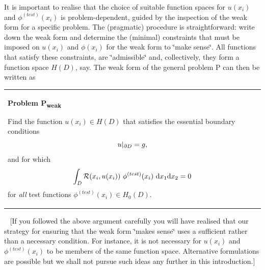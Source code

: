 It is important to realise that the choice of suitable function spaces for $u(x_i)$ and $\phi^{(test)}(x_i)$ is problem-\/dependent, guided by the inspection of the weak form for a specific problem. The (pragmatic) procedure is straightforward\+: write down the weak form and determine the (minimal) constraints that must be imposed on $u(x_i)$ and $\phi(x_i)$ for the weak form to \char`\"{}make sense\char`\"{}. All functions that satisfy these constraints, are \char`\"{}admissible\char`\"{} and, collectively, they form a function space $ H(D) $, say. The weak form of the general problem P can then be written as ~\newline
 ~\newline
\begin{center} \tabulinesep=1mm
\begin{longtabu} spread 0pt [c]{*{1}{|X[-1]}|}
\hline
\begin{center}{\bfseries  Problem P\textsubscript{weak} }\end{center}  \begin{center} Find the function $ u(x_i) \in H(D) $ that satisfies the essential boundary conditions \[ \hfill u|_{\partial D} = g, \] and for which \[ \int_D {\cal R}(x_i,u(x_i)) \ \phi^{(test)}(x_i) \ \mbox{d}x_1 \mbox{d}x_2 = 0 \] for {\itshape all} test functions $ \phi^{(test)}(x_i) \in H_0(D). $ \end{center}    \\
\end{longtabu}
\end{center}  ~\newline
 \mbox{[}If you followed the above argument carefully you will have realised that our strategy for ensuring that the weak form \char`\"{}makes sense\char`\"{} uses a sufficient rather than a necessary condition. For instance, it is not necessary for $ u(x_i)$ and $ \phi^{(test)}(x_i)$ to be members of the same function space. Alternative formulations are possible but we shall not pursue such ideas any further in this introduction.\mbox{]}



